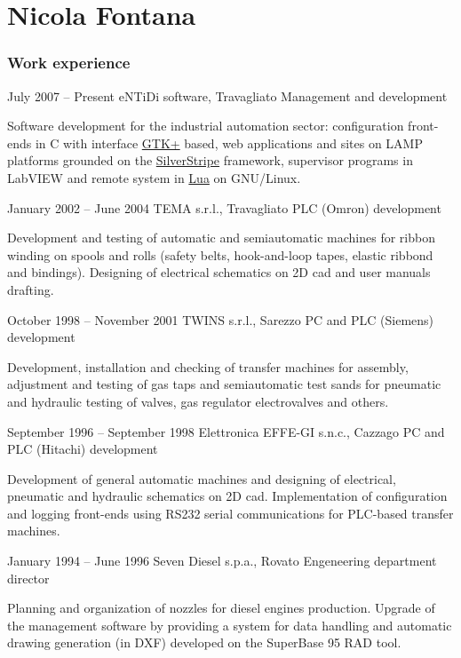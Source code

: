 \documentclass{tccv}
\begin{document}
\part{Nicola Fontana}

\section{Work experience}

\begin{eventlist}

\item{July 2007 -- Present}
     {eNTiDi software, Travagliato}
     {Management and development}

Software development for the industrial automation sector: configuration
front-ends in C with interface \href{http://www.gtk.org/}{GTK+} based,
web applications and sites on LAMP platforms grounded on the
\href{http://www.silverstripe.org/}{SilverStripe} framework,
supervisor programs in LabVIEW and remote system in
\href{http://www.lua.org/}{Lua} on GNU/Linux.

\item{January 2002 -- June 2004}
     {TEMA s.r.l., Travagliato}
     {PLC (Omron) development}

Development and testing of automatic and semiautomatic machines for
ribbon winding on spools and rolls (safety belts, hook-and-loop tapes,
elastic ribbond and bindings). Designing of electrical schematics on
2D cad and user manuals drafting.

\item{October 1998 -- November 2001}
     {TWINS s.r.l., Sarezzo}
     {PC and PLC (Siemens) development}

Development, installation and checking of transfer machines for
assembly, adjustment and testing of gas taps and semiautomatic test
sands for pneumatic and hydraulic testing of valves, gas regulator
electrovalves and others.

\item{September 1996 -- September 1998}
     {Elettronica EFFE-GI s.n.c., Cazzago}
     {PC and PLC (Hitachi) development}

Development of general automatic machines and designing of electrical,
pneumatic and hydraulic schematics on 2D cad. Implementation of
configuration and logging front-ends using RS232 serial communications
for PLC-based transfer machines.

\item{January 1994 -- June 1996}
     {Seven Diesel s.p.a., Rovato}
     {Engeneering department director}

Planning and organization of nozzles for diesel engines production.
Upgrade of the management software by providing a system for data
handling and automatic drawing generation (in DXF) developed on the
SuperBase 95 RAD tool.

\end{eventlist}
\end{document}
